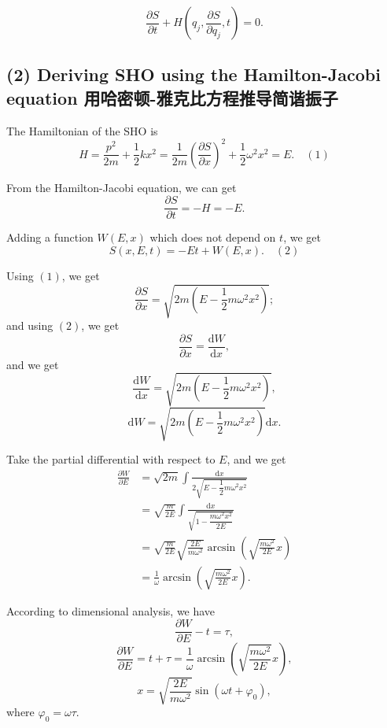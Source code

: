\[\frac{\partial S}{\partial t} + H \left( q_j, \frac{\partial S}{\partial q_j}, t \right) = 0.\]

\subsection*{(2) Deriving SHO using the Hamilton-Jacobi equation
用哈密顿-雅克比方程推导简谐振子}\label{deriving-sho-using-the-hamilton-jacobi-equation-ux7528ux54c8ux5bc6ux987f-ux96c5ux514bux6bd4ux65b9ux7a0bux63a8ux5bfcux7b80ux8c10ux632fux5b50}

The Hamiltonian of the SHO is
\[H = \frac{p^2}{2m} + \frac{1}{2} kx^2 = \frac{1}{2m} \left( \frac{\partial S}{\partial x} \right)^2 + \frac{1}{2} \omega^2 x^2 = E. \quad (1)\]

From the Hamilton-Jacobi equation, we can get
\[\frac{\partial S}{\partial t} = - H = - E.\]

Adding a function \(W(E, x)\) which does not depend on \(t\), we get
\[S(x, E, t) = - Et + W(E, x). \quad (2)\]

Using \((1)\), we get
\[\frac{\partial S}{\partial x} = \sqrt{2m \left( E - \frac{1}{2}m \omega^2 x^2 \right)};\]
and using \((2)\), we get
\[\frac{\partial S}{\partial x} = \frac{\mathrm{d}W}{\mathrm{d}x},\] and
we get
\[\frac{\mathrm{d}W}{\mathrm{d}x} = \sqrt{2m \left( E - \frac{1}{2}m \omega^2 x^2 \right)},\]
\[\mathrm{d}W = \sqrt{2m \left( E - \frac{1}{2}m \omega^2 x^2 \right)} \mathrm{d}x.\]

Take the partial differential with respect to \(E\), and we get
\begin{align*}
    \frac{\partial W}{\partial E} & = \sqrt{2m} \int \frac{\mathrm{d}x}{2 \sqrt{E - \dfrac{1}{2}m \omega^2 x^2}} \\
    & = \sqrt{\frac{m}{2E}} \int \frac{\mathrm{d}x}{\sqrt{1 - \dfrac{m \omega^2 x^2}{2E}}} \\
    & = \sqrt{\frac{m}{2E}} \sqrt{\frac{2E}{m \omega^2}} \arcsin \left( \sqrt{\frac{m \omega^2}{2E}} x \right) \\
    & = \frac{1}{\omega} \arcsin \left( \sqrt{\frac{m \omega^2}{2E}} x \right).
\end{align*}

According to dimensional analysis, we have
\[\frac{\partial W}{\partial E} - t = \tau,\]
\[\frac{\partial W}{\partial E} = t + \tau = \frac{1}{\omega} \arcsin \left( \sqrt{\frac{m \omega^2}{2E}} x \right),\]
\[x = \sqrt{\frac{2E}{m \omega^2}} \sin \left( \omega t + \varphi_0 \right),\]
where \(\varphi_0 = \omega \tau\).


